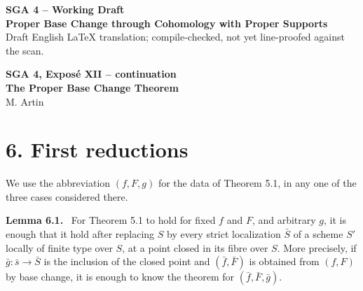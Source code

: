\documentclass[12pt]{article}
\newenvironment{statement}[1]{\par\medskip\noindent\textbf{#1.}\ }{\par\medskip}
\begin{document}
\begin{center}
{\Large \textbf{SGA 4 -- Working Draft}}\\[0.4em]
{\large \textbf{Proper Base Change through Cohomology with Proper Supports}}\\[0.25em]
{\normalsize Draft English LaTeX translation; compile-checked, not yet line-proofed against the scan.}
\end{center}

\bigskip

\begin{center}
{\Large \textbf{SGA 4, Expos\'e XII -- continuation}}\\[0.35em]
{\large \textbf{The Proper Base Change Theorem}}\\[0.25em]
{\normalsize M. Artin}
\end{center}

\section*{6. First reductions}

We use the abbreviation \((f,F,g)\) for the data of Theorem 5.1, in any one of the three cases considered there.

\begin{statement}{Lemma 6.1}
For Theorem 5.1 to hold for fixed \(f\) and \(F\), and arbitrary \(g\), it is enough that it hold after replacing \(S\) by every strict localization \(\bar S\) of a scheme \(S'\) locally of finite type over \(S\), at a point closed in its fibre over \(S\). More precisely, if \(\bar g:\bar s\to \bar S\) is the inclusion of the closed point and \((\bar f,\bar F)\) is obtained from \((f,F)\) by base change, it is enough to know the theorem for \((\bar f,\bar F,\bar g)\).
\end{statement}
\end{document}
